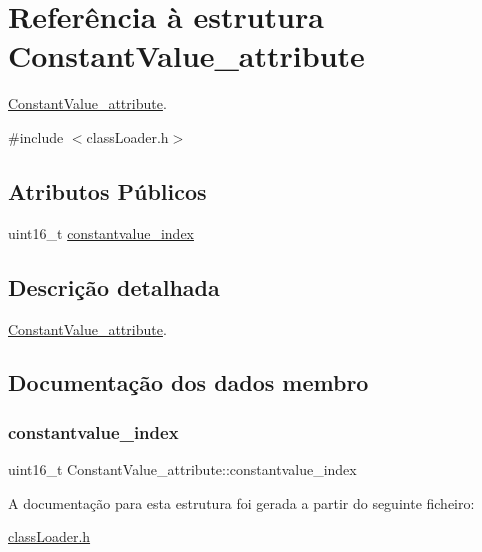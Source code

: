 \hypertarget{struct_constant_value__attribute}{}\section{Referência à estrutura Constant\+Value\+\_\+attribute}
\label{struct_constant_value__attribute}


\hyperlink{struct_constant_value__attribute}{Constant\+Value\+\_\+attribute}.  




{\ttfamily \#include $<$class\+Loader.\+h$>$}

\subsection*{Atributos Públicos}
\begin{DoxyCompactItemize}
\item 
uint16\+\_\+t \hyperlink{struct_constant_value__attribute_a403cfba15ceb19a3715106a3a9822cc5}{constantvalue\+\_\+index}
\end{DoxyCompactItemize}


\subsection{Descrição detalhada}
\hyperlink{struct_constant_value__attribute}{Constant\+Value\+\_\+attribute}. 

\subsection{Documentação dos dados membro}
\hypertarget{struct_constant_value__attribute_a403cfba15ceb19a3715106a3a9822cc5}{}\label{struct_constant_value__attribute_a403cfba15ceb19a3715106a3a9822cc5} 
\subsubsection{\texorpdfstring{constantvalue\+\_\+index}{constantvalue\_index}}
{\footnotesize\ttfamily uint16\+\_\+t Constant\+Value\+\_\+attribute\+::constantvalue\+\_\+index}



A documentação para esta estrutura foi gerada a partir do seguinte ficheiro\+:\begin{DoxyCompactItemize}
\item 
\hyperlink{class_loader_8h}{class\+Loader.\+h}\end{DoxyCompactItemize}
